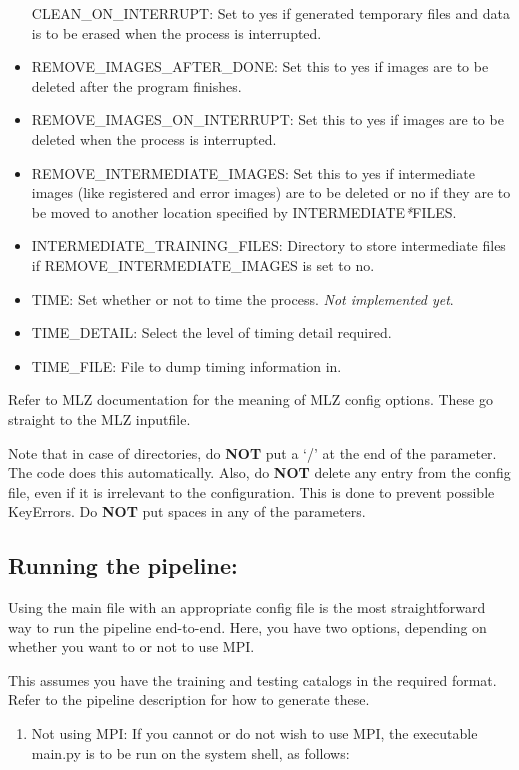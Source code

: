 \documentclass{article}
\begin{document}
\begin{itemize}
  CLEAN\_ON\_INTERRUPT: Set to yes if generated temporary files and data
  is to be erased when the process is interrupted.
\item
  REMOVE\_IMAGES\_AFTER\_DONE: Set this to yes if images are to be
  deleted after the program finishes.
\item
  REMOVE\_IMAGES\_ON\_INTERRUPT: Set this to yes if images are to be
  deleted when the process is interrupted.
\item
  REMOVE\_INTERMEDIATE\_IMAGES: Set this to yes if intermediate images
  (like registered and error images) are to be deleted or no if they are
  to be moved to another location specified by
  INTERMEDIATE\emph{*}FILES.
\item
  INTERMEDIATE\_TRAINING\_FILES: Directory to store intermediate files
  if REMOVE\_INTERMEDIATE\_IMAGES is set to no.
\item
  TIME: Set whether or not to time the process. \emph{Not implemented
  yet}.
\item
  TIME\_DETAIL: Select the level of timing detail required.
\item
  TIME\_FILE: File to dump timing information in.
\end{itemize}
Refer to MLZ documentation for the meaning of MLZ config options. These
go straight to the MLZ inputfile.

Note that in case of directories, do \textbf{NOT} put a `/' at the end
of the parameter. The code does this automatically. Also, do
\textbf{NOT} delete any entry from the config file, even if it is
irrelevant to the configuration. This is done to prevent possible
KeyErrors. Do \textbf{NOT} put spaces in any of the parameters.

    \subsection{Running the pipeline:}

Using the main file with an appropriate config file is the most
straightforward way to run the pipeline end-to-end. Here, you have two
options, depending on whether you want to or not to use MPI.

This assumes you have the training and testing catalogs in the required
format. Refer to the pipeline description for how to generate these.

\begin{enumerate}[1)]
\item
  Not using MPI: If you cannot or do not wish to use MPI, the executable
  main.py is to be run on the system shell, as follows:
\end{enumerate}
\end{document}
